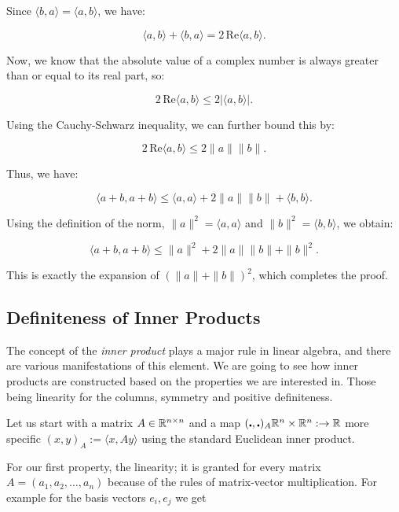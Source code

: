 Since \( \langle b, a \rangle = \langle a, b \rangle \), we have:

\[
    \langle a, b \rangle + \langle b, a \rangle = 2 \, \text{Re} \langle a, b \rangle.
\]

Now, we know that the absolute value of a complex number is always greater than or equal to its 
real part, so:

\[
    2 \, \text{Re} \langle a, b \rangle \leq 2 |\langle a, b \rangle|.
\]

Using the Cauchy-Schwarz inequality, we can further bound this by:

\[
    2 \, \text{Re} \langle a, b \rangle \leq 2 \|a\| \|b\|.
\]

Thus, we have:

\[
    \langle a + b, a + b \rangle \leq \langle a, a \rangle + 2 \|a\| \|b\| + \langle b, b \rangle.
\]

Using the definition of the norm, \( \|a\|^2 = \langle a, a \rangle \) and \( \|b\|^2 = \langle b, b 
\rangle \), we obtain:

\[
    \langle a + b, a + b \rangle \leq \|a\|^2 + 2 \|a\| \|b\| + \|b\|^2.
\]

This is exactly the expansion of \( {(\|a\| + \|b\|)}^2 \), which completes the proof.

\QED

\subsection{Definiteness of Inner Products}

The concept of the \emph{inner product} plays a major rule in linear algebra, and there are various 
manifestations of this element. We are going to see how inner products are constructed based on the 
properties we are interested in. Those being linearity for the columns, symmetry and positive definiteness.
\vspace{\baselineskip}

Let us start with a matrix \(A \in \mathbb{R}^{n \times n}\) and a map 
\((\centerdot , \centerdot)_A \mathbb{R}^n \times \mathbb{R}^n : \to \mathbb{R} \) more specific 
\((x,y)_A := \langle x, Ay\rangle\) using the standard Euclidean inner product.
\vspace{\baselineskip}

For our first property, the linearity; it is granted for every matrix \(A = (a_1, a_2, \dots, a_n)\) 
because of the rules of matrix-vector multiplication. For example for the basis vectors \(e_i, e_j\) 
we get 

